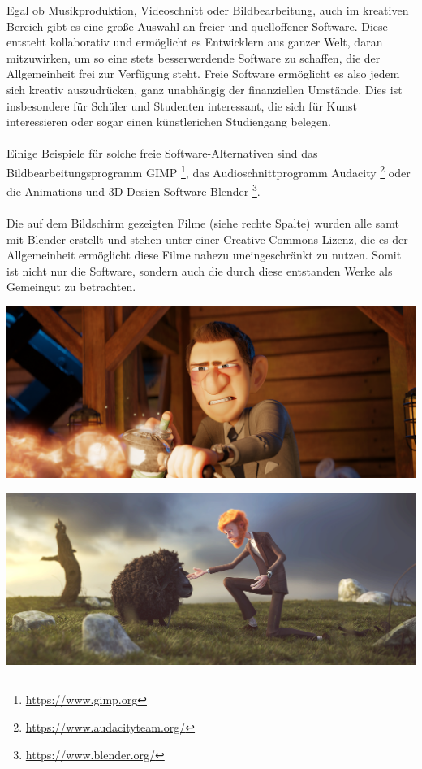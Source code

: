 \documentclass[a0,portrait]{a0poster}
\begin{document}
\vspace{1cm}
\begin{multicols}{2}
\huge Egal ob Musikproduktion, Videoschnitt oder Bildbearbeitung, auch im kreativen Bereich gibt es eine große Auswahl an freier und quelloffener Software. Diese entsteht kollaborativ und ermöglicht es Entwicklern aus ganzer Welt, daran mitzuwirken, um so eine stets besserwerdende Software zu schaffen, die der Allgemeinheit frei zur Verfügung steht. Freie Software ermöglicht es also jedem sich kreativ auszudrücken, ganz unabhängig der finanziellen Umstände. Dies ist insbesondere für Schüler und Studenten interessant, die sich für Kunst interessieren oder sogar einen künstlerichen Studiengang belegen.\\\\
Einige Beispiele für solche freie Software-Alternativen sind das Bildbearbeitungsprogramm GIMP \footnote{\Large\url{https://www.gimp.org}}, das Audioschnittprogramm Audacity \footnote{\Large\url{https://www.audacityteam.org/}} oder die Animations und 3D-Design Software Blender \footnote{\Large\url{https://www.blender.org/}}.\\\\
Die auf dem Bildschirm gezeigten Filme (siehe rechte Spalte) wurden alle samt mit Blender erstellt und stehen unter einer Creative Commons Lizenz, die es der Allgemeinheit ermöglicht diese Filme nahezu uneingeschränkt zu nutzen. Somit ist nicht nur die Software, sondern auch die durch diese entstanden Werke als Gemeingut zu betrachten.

\columnbreak

\includegraphics[scale=0.5]{figures/a327_barbershop_04861.png}
\vspace*{2cm}

\includegraphics[scale=0.51]{figures/gooseberry_benchmark_01.jpg}
\vspace*{2cm}


\end{multicols}
\end{document}
